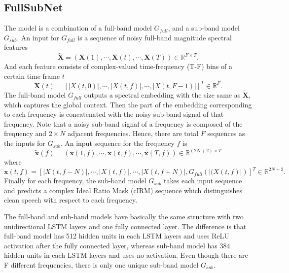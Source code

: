 \documentclass{article}
\begin{document}
\subsection{FullSubNet}

The model is a combination of a full-band model $G_{full}$, and a sub-band model $G_{sub}$. An input for $G_{full}$ is a sequence of noisy full-band magnitude spectral features
\begin{equation}
    \widetilde{\textbf{X}} =         (\textbf{X}(1),\cdots,\textbf{X}(t),\cdots,\textbf{X}(T))\in \mathbb{R}^{F\times{T}}.
\end{equation}
And each feature consists of complex-valued time-frequency (T-F) bins of a certain time frame $t$
\begin{equation}
    \textbf{X}(t) = \left [ \left| X(t,0)\right|,\cdots,\left| X(t,f)\right|,\cdots, \left|X(t,F-1)\right| \right ]^{T}\in \mathbb{R}^{F}.
\end{equation}
The full-band model $G_{full}$ outputs a spectral embedding with the size same as $\widetilde{\textbf{X}}$, which captures the global context. Then the part of the embedding corresponding to each frequency is concatenated with the noisy sub-band signal of that frequency. Note that a noisy sub-band signal of a frequency is composed of the frequency and $2\times{N}$ adjacent frequencies. Hence, there are total $F$ sequences as the inputs for $G_{sub}$. An input sequence for the frequency $f$ is
\begin{equation}
    \widetilde{\textbf{x}}(\mathit{f}) =         (\textbf{x}(1,\mathit{f}),\cdots,\textbf{x}(t,\mathit{f}),\cdots,\textbf{x}(T,\mathit{f}))\in \mathbb{R}^{(2N+2)\times{T}}
\end{equation}
where
\begin{equation}
\textbf{x}(t,f) = \left [ \left| X(t,f-N)\right|,\cdots,\left| X(t,f)\right|,\cdots, \left|X(t,f+N)\right|, G_{full}(\left|(X(t,f)\right|)\right ]^{T}\in \mathbb{R}^{2N+2}.
\end{equation} 
Finally for each frequency, the sub-band model $G_{sub}$ takes each input sequence and predicts a complex Ideal Ratio Mask (cIRM) sequence which distinguishes clean speech with respect to each frequency.

The full-band and sub-band models have basically the same structure with two unidirectional LSTM layers and one fully connected layer. The difference is that full-band model has 512 hidden units in each LSTM layers and uses ReLU activation after the fully connected layer, whereas sub-band model has 384 hidden units in each LSTM layers and uses no activation. Even though there are F different frequencies, there is only one unique sub-band model $G_{sub}$. 
\end{document}

